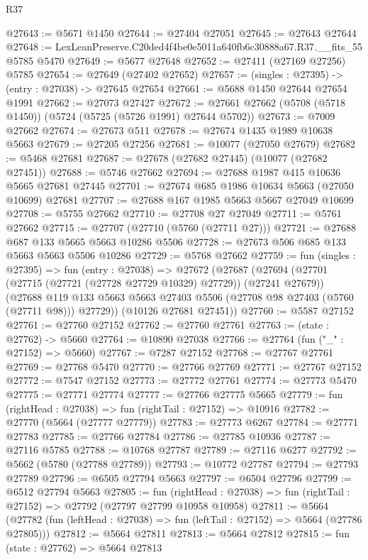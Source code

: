 \begin{lexlean}{R37}
\begin{coremodule}
@27643 := @5671 @1450
@27644 := @27404 @27051
@27645 := @27643 @27644
@27648 := LexLeanPreserve.C20ded4f4be0e5011a640fb6c30888a67.R37.__fits_55 @5785 @5470
@27649 := @5677 @27648
@27652 := @27411 (@27169 @27256) @5785
@27654 := @27649 (@27402 @27652)
@27657 := (singles : @27395) -> (entry : @27038) -> @27645 @27654
@27661 := @5688 @1450 @27644 @27654 @1991
@27662 := @27073 @27427
@27672 := @27661 @27662 (@5708 (@5718 @1450)) (@5724 (@5725 (@5726 @1991) @27644 @5702))
@27673 := @7009 @27662
@27674 := @27673 @511
@27678 := @27674 @1435 @1989 @10638 @5663
@27679 := @27205 @27256
@27681 := @10077 (@27050 @27679)
@27682 := @5468 @27681
@27687 := @27678 (@27682 @27445) (@10077 (@27682 @27451))
@27688 := @5746 @27662
@27694 := @27688 @1987 @415 @10636 @5665 @27681 @27445
@27701 := @27674 @685 @1986 @10634 @5663 (@27050 @10699) @27681
@27707 := @27688 @167 @1985 @5663 @5667 @27049 @10699
@27708 := @5755 @27662
@27710 := @27708 @27 @27049
@27711 := @5761 @27662
@27715 := @27707 (@27710 (@5760 (@27711 @27)))
@27721 := @27688 @687 @133 @5665 @5663 @10286 @5506
@27728 := @27673 @506 @685 @133 @5663 @5663 @5506 @10286
@27729 := @5768 @27662
@27759 := fun (singles : @27395) =>
  fun (entry : @27038) =>
  @27672
    (@27687
      (@27694
        (@27701 (@27715 (@27721 (@27728 @27729 @10329) @27729)) (@27241 @27679))
        (@27688 @119 @133 @5663 @5663 @27403 @5506 (@27708 @98 @27403 (@5760 (@27711 @98))) @27729))
      (@10126 @27681 @27451))
@27760 := @5587 @27152
@27761 := @27760 @27152
@27762 := @27760 @27761
@27763 := (state : @27762) -> @5660
@27764 := @10890 @27038
@27766 := @27764 (fun ("_" : @27152) => @5660)
@27767 := @7287 @27152
@27768 := @27767 @27761
@27769 := @27768 @5470
@27770 := @27766 @27769
@27771 := @27767 @27152
@27772 := @7547 @27152
@27773 := @27772 @27761
@27774 := @27773 @5470
@27775 := @27771 @27774
@27777 := @27766 @27775 @5665
@27779 := fun (rightHead : @27038) => fun (rightTail : @27152) => @10916
@27782 := @27770 (@5664 (@27777 @27779))
@27783 := @27773 @6267
@27784 := @27771 @27783
@27785 := @27766 @27784
@27786 := @27785 @10936
@27787 := @27116 @5785
@27788 := @10768 @27787
@27789 := @27116 @6277
@27792 := @5662 (@5780 (@27788 @27789))
@27793 := @10772 @27787
@27794 := @27793 @27789
@27796 := @6505 @27794 @5663
@27797 := @6504 @27796
@27799 := @6512 @27794 @5663
@27805 := fun (rightHead : @27038) =>
  fun (rightTail : @27152) => @27792 (@27797 @27799 @10958 @10958)
@27811 := @5664
    (@27782 (fun (leftHead : @27038) => fun (leftTail : @27152) => @5664 (@27786 @27805)))
@27812 := @5664 @27811
@27813 := @5664 @27812
@27815 := fun (state : @27762) => @5664 @27813

\end{coremodule}
\end{lexlean}
